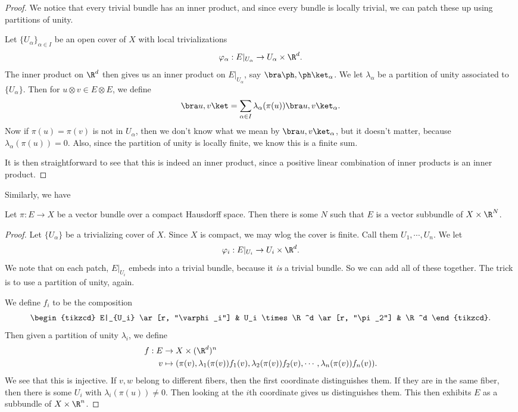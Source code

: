 \documentclass[a4paper]{article}
\begin{document}
\begin{proof}
  We notice that every trivial bundle has an inner product, and since every bundle is locally trivial, we can patch these up using partitions of unity.

  Let $\{U_\alpha\}_{\alpha \in I}$ be an open cover of $X$ with local trivializations
  \[
    \varphi_\alpha: E|_{U_\alpha} \to U_\alpha \times \R^d.
  \]
  The inner product on $\R^d$ then gives us an inner product on $E|_{U_\alpha}$, say $\bra \ph, \ph\ket_\alpha$. We let $\lambda_\alpha$ be a partition of unity associated to $\{U_\alpha\}$. Then for $u\otimes v \in E \otimes E$, we define
  \[
    \bra u, v\ket = \sum_{\alpha \in I} \lambda_\alpha(\pi(u)) \bra u, v\ket_\alpha.
  \]
  Now if $\pi(u) = \pi(v)$ is not in $U_\alpha$, then we don't know what we mean by $\bra u, v\ket_\alpha$, but it doesn't matter, because $\lambda_\alpha(\pi(u)) = 0$. Also, since the partition of unity is locally finite, we know this is a finite sum.

  It is then straightforward to see that this is indeed an inner product, since a positive linear combination of inner products is an inner product.
\end{proof}

Similarly, we have
\begin{lemma}
  Let $\pi: E \to X$ be a vector bundle over a compact Hausdorff space. Then there is some $N$ such that $E$ is a vector subbundle of $X \times \R^N$.
\end{lemma}

\begin{proof}
   Let $\{U_\alpha\}$ be a trivializing cover of $X$. Since $X$ is compact, we may wlog the cover is finite. Call them $U_1, \cdots, U_n$. We let
  \[
    \varphi_i: E|_{U_i} \to U_i \times \R^d.
  \]
  We note that on each patch, $E|_{U_i}$ embeds into a trivial bundle, because it \emph{is} a trivial bundle. So we can add all of these together. The trick is to use a partition of unity, again.

  We define $f_i$ to be the composition
  \[
    \begin{tikzcd}
      E|_{U_i} \ar[r, "\varphi_i"] & U_i \times \R^d \ar[r, "\pi_2"] & \R^d
    \end{tikzcd}.
  \]
  Then given a partition of unity $\lambda_i$, we define
  \begin{align*}
    f: E &\to X \times (\R^d)^n\\
    v&\mapsto (\pi(v), \lambda_1(\pi(v)) f_1(v), \lambda_2(\pi(v)) f_2(v), \cdots, \lambda_n(\pi(v)) f_n(v)).
  \end{align*}
  We see that this is injective. If $v, w$ belong to different fibers, then the first coordinate distinguishes them. If they are in the same fiber, then there is some $U_i$ with $\lambda_i(\pi(u)) \not= 0$. Then looking at the $i$th coordinate gives us distinguishes them. This then exhibits $E$ as a subbundle of $X \times \R^n$.
\end{proof}
\end{document}
